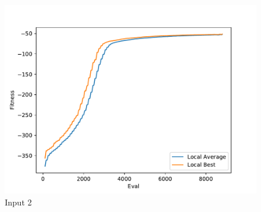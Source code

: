 \documentclass{standalone}
\begin{document}
\begin{figure}[!htb]
	\caption{Input 2}
	\label{fig:graph_2044}
	\includegraphics[width=\textwidth]{../graphs/graphs/2044.pdf}
\end{figure}
\end{document}
